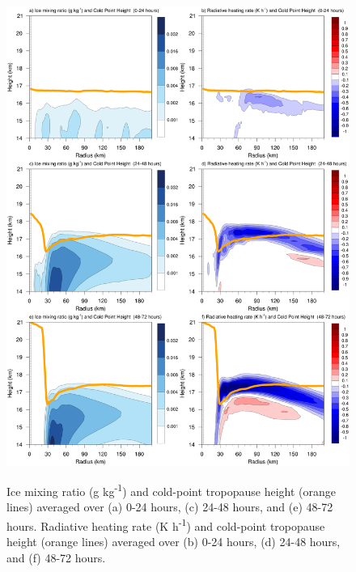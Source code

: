 \begin{figure}[ht]
\centerline{\includegraphics[width=39pc]{figures/qi+radten.png}}
\end{figure}
\begin{figure}
\caption{Ice mixing ratio (g kg\textsuperscript{-1}) and cold-point tropopause height (orange lines) averaged over (a) 0-24 hours, (c) 24-48 hours, and (e) 48-72 hours. Radiative heating rate (K h\textsuperscript{-1}) and cold-point tropopause height (orange lines) averaged over (b) 0-24 hours, (d) 24-48 hours, and (f) 48-72 hours.}
\label{fig:qi+radten}
\end{figure}

